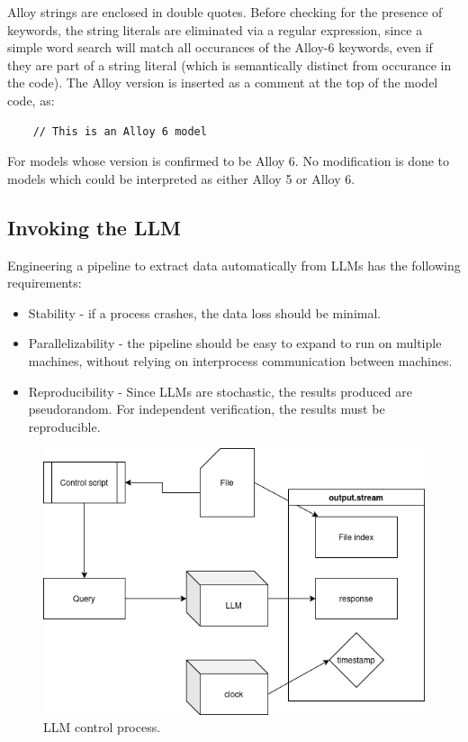 \documentclass[conference]{IEEEtran}
\begin{document}
Alloy strings are enclosed in double quotes. Before checking for the presence of keywords, the string literals are eliminated via a regular expression, since a simple word search will match all occurances of the Alloy-6 keywords, even if they are part of a string literal (which is semantically distinct from occurance in the code). The Alloy version is inserted as a comment at the top of the model code, as:

\begin{lstlisting}
    // This is an Alloy 6 model
\end{lstlisting}

For models whose version is confirmed to be Alloy 6. No modification is done to models which could be interpreted as either Alloy 5 or Alloy 6.

\subsection{Invoking the LLM}

Engineering a pipeline to extract data automatically from LLMs has the following requirements:

\begin{itemize}
    \item Stability - if a process crashes, the data loss should be minimal.
    \item Parallelizability - the pipeline should be easy to expand to run on multiple machines, without relying on interprocess communication between machines.
    \item Reproducibility - Since LLMs are stochastic, the results produced are pseudorandom. For independent verification, the results must be reproducible.
\end{itemize}

\begin{figure}[htbp]
    \centerline{\includegraphics[width=\linewidth]{"./images/process.png"}}
    \caption{LLM control process.}
    \label{fig}
    \end{figure}
\end{document}
